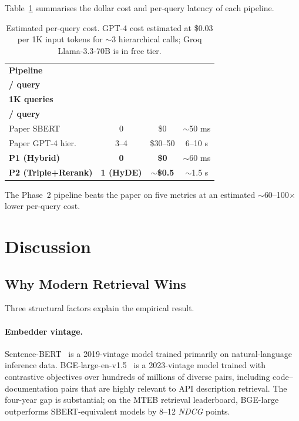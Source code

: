 \documentclass[10pt,a4paper,twocolumn]{article}
\begin{document}
Table~\ref{tab:cost} summarises the dollar cost and per-query latency
of each pipeline.

\begin{table}[h!]
\centering
\caption{Estimated per-query cost. GPT-4 cost estimated at \$0.03
per 1K input tokens for $\sim$3 hierarchical calls; Groq
Llama-3.3-70B is in free tier.}
\label{tab:cost}
\footnotesize
\begin{tabular}{lccc}
\toprule
\textbf{Pipeline} & \makecell{\textbf{LLM calls}\\\textbf{/ query}} & \makecell{\textbf{\$ /}\\\textbf{1K queries}} & \makecell{\textbf{Latency}\\\textbf{/ query}} \\
\midrule
Paper SBERT                  & 0    & \$0      & $\sim$50 ms \\
Paper GPT-4 hier.            & 3--4 & \$30--50 & 6--10 s \\
\textbf{P1 (Hybrid)}         & \textbf{0} & \textbf{\$0} & $\sim$60 ms \\
\textbf{P2 (Triple+Rerank)}  & \textbf{1 (HyDE)} & \textbf{$\sim$\$0.5} & $\sim$1.5 s \\
\bottomrule
\end{tabular}
\end{table}

The Phase~2 pipeline beats the paper on five metrics at an estimated
$\sim$60--100$\times$ lower per-query cost.

\section{Discussion}\label{sec:discussion}

\subsection{Why Modern Retrieval Wins}

Three structural factors explain the empirical result.

\paragraph{Embedder vintage.} Sentence-BERT~\cite{reimers2019sbert}
is a 2019-vintage model trained primarily on natural-language
inference data. BGE-large-en-v1.5~\cite{xiao2023cpack} is a
2023-vintage model trained with contrastive objectives over hundreds
of millions of diverse pairs, including code--documentation pairs
that are highly relevant to API description retrieval. The four-year
gap is substantial; on the MTEB retrieval leaderboard, BGE-large
outperforms SBERT-equivalent models by 8--12 \emph{NDCG} points.
\end{document}
